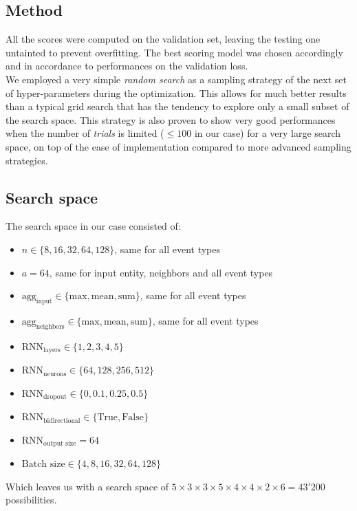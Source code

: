 \subsection{Method}

All the scores were computed on the validation set, leaving the testing one untainted to prevent overfitting. The best scoring model was chosen accordingly and in accordance to performances on the validation loss. \\

We employed a very simple \emph{random search} as a sampling strategy of the next set of hyper-parameters during the optimization. This allows for much better results than a typical grid search that has the tendency to explore only a small subset of the search space. This strategy is also proven to show very good performances when the number of \textit{trials} is limited ($\leq 100$ in our case) for a very large search space, on top of the ease of implementation compared to more advanced sampling strategies.

\subsection{Search space}
The search space in our case consisted of:

\begin{itemize}
 \item $n \in \{8, 16, 32, 64, 128\}$, same for all event types
 \item $a=64$, same for input entity, neighbors and all event types
 \item $\mbox{agg}_{\mbox{input}} \in \{\mbox{max}, \mbox{mean}, \mbox{sum}\}$, same for all event types
 \item $\mbox{agg}_{\mbox{neighbors}} \in \{\mbox{max}, \mbox{mean}, \mbox{sum}\}$, same for all event types
 \item $\mbox{RNN}_{\mbox{layers}} \in \{1, 2, 3, 4, 5\}$
 \item $\mbox{RNN}_{\mbox{neurons}} \in \{64, 128, 256, 512\}$
 \item $\mbox{RNN}_{\mbox{dropout}} \in \{0, 0.1, 0.25, 0.5\}$
 \item $\mbox{RNN}_{\mbox{bidirectional}} \in \{\mbox{True}, \mbox{False}\}$
 \item $\mbox{RNN}_{\mbox{output size}} = 64$
 \item $\mbox{Batch size} \in \{4, 8, 16, 32, 64, 128\}$
\end{itemize}
Which leaves us with a search space of $5 \times 3 \times 3 \times 5 \times 4 \times 4 \times 2 \times 6 = 43'200$ possibilities.

